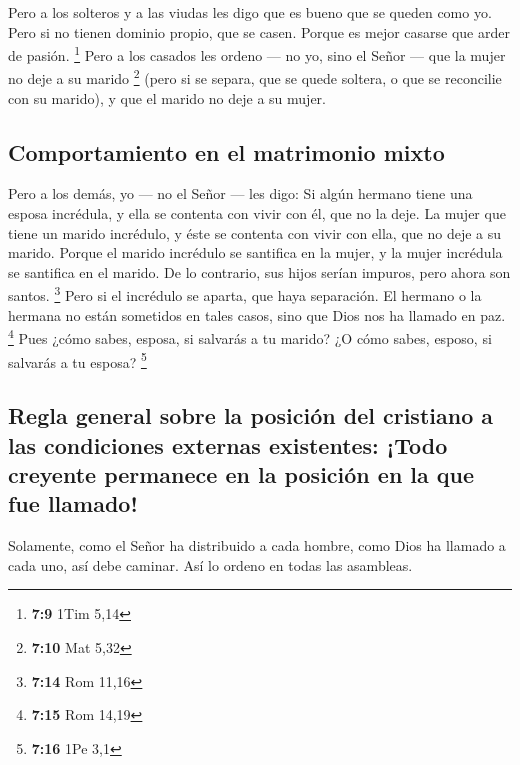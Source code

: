 \begin{paracol}{2}
 Pero a los solteros y a las viudas les digo que es bueno
que se queden como yo.  Pero si no tienen dominio propio,
que se casen. Porque es mejor casarse que arder de pasión. \footnote{\textbf{7:9}
  1Tim 5,14}  Pero a los casados les ordeno --- no yo,
sino el Señor --- que la mujer no deje a su marido \footnote{\textbf{7:10}
  Mat 5,32}  (pero si se separa, que se quede soltera, o
que se reconcilie con su marido), y que el marido no deje a su mujer.

\hypertarget{comportamiento-en-el-matrimonio-mixto}{%
\subsection{Comportamiento en el matrimonio
mixto}\label{comportamiento-en-el-matrimonio-mixto}}

 Pero a los demás, yo --- no el Señor --- les digo: Si
algún hermano tiene una esposa incrédula, y ella se contenta con vivir
con él, que no la deje.  La mujer que tiene un marido
incrédulo, y éste se contenta con vivir con ella, que no deje a su
marido.  Porque el marido incrédulo se santifica en la
mujer, y la mujer incrédula se santifica en el marido. De lo contrario,
sus hijos serían impuros, pero ahora son santos. \footnote{\textbf{7:14}
  Rom 11,16}  Pero si el incrédulo se aparta, que haya
separación. El hermano o la hermana no están sometidos en tales casos,
sino que Dios nos ha llamado en paz. \footnote{\textbf{7:15} Rom 14,19}
 Pues ¿cómo sabes, esposa, si salvarás a tu marido? ¿O
cómo sabes, esposo, si salvarás a tu esposa? \footnote{\textbf{7:16} 1Pe
  3,1}

\hypertarget{regla-general-sobre-la-posiciuxf3n-del-cristiano-a-las-condiciones-externas-existentes-todo-creyente-permanece-en-la-posiciuxf3n-en-la-que-fue-llamado}{%
\subsection{Regla general sobre la posición del cristiano a las
condiciones externas existentes: ¡Todo creyente permanece en la posición
en la que fue
llamado!}\label{regla-general-sobre-la-posiciuxf3n-del-cristiano-a-las-condiciones-externas-existentes-todo-creyente-permanece-en-la-posiciuxf3n-en-la-que-fue-llamado}}

 Solamente, como el Señor ha distribuido a cada hombre,
como Dios ha llamado a cada uno, así debe caminar. Así lo ordeno en
todas las asambleas.


\end{paracol}
